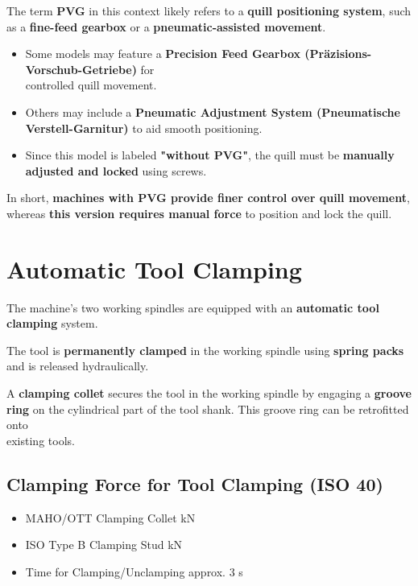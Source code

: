 The term \textbf{PVG} in this context likely refers to a \textbf{quill positioning system}, such as a \textbf{fine-feed gearbox} or a \textbf{pneumatic-assisted movement}.

\begin{itemize}
    \item Some models may feature a \textbf{Precision Feed Gearbox (Präzisions-Vorschub-Getriebe)} for \\controlled quill movement.
    \item Others may include a \textbf{Pneumatic Adjustment System (Pneumatische Verstell-Garnitur)} to aid smooth positioning.
    \item Since this model is labeled \textbf{"without PVG"}, the quill must be \textbf{manually adjusted and locked} using screws.
\end{itemize}

\noindent In short, \textbf{machines with PVG provide finer control over quill movement}, whereas \textbf{this version requires manual force} to position and lock the quill.


\section{Automatic Tool Clamping}
\setcounter{section}{12}

The machine's two working spindles are equipped with an \textbf{automatic tool clamping} system.

\vspace{.3cm}

\noindent The tool is \textbf{permanently clamped} in the working spindle using \textbf{spring packs} and is released hydraulically.

\vspace{.3cm}

\noindent A \textbf{clamping collet} secures the tool in the working spindle by engaging a \textbf{groove ring} on the cylindrical part of the tool shank. This groove ring can be retrofitted onto\\ existing tools.\footnotemark


\subsection{Clamping Force for Tool Clamping (ISO 40)}

\begin{itemize}[itemsep=1pt,parsep=0pt]
   \item MAHO/OTT Clamping Collet   kN \\
   \item ISO Type B Clamping Stud \dotfill {} kN \\
  \item  Time for Clamping/Unclamping \dotfill \> approx. 3 s
\end{itemize}

